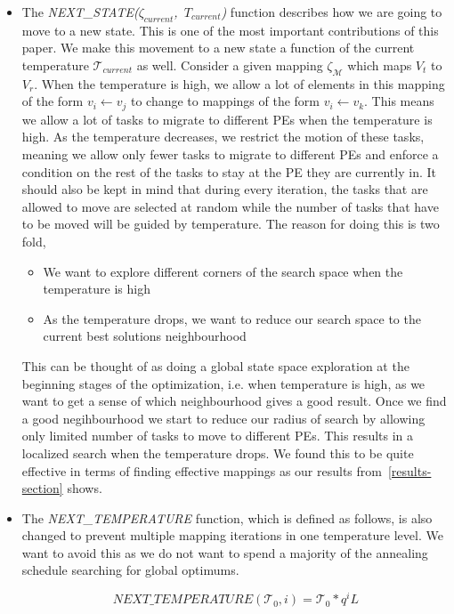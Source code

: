 \begin{itemize}
\item The \mbox{\textit{NEXT\_STATE($\zeta_{current}$, $T_{current}$)}} function
describes how we are going to move to a new state. This is one of the most
important contributions of this paper. We make this movement to a new state a
function of the current temperature $\mathcal{T}_{current}$ as well. Consider a
given mapping $\zeta_\mathcal{M}$ which maps $V_t$ to $V_r$. When the
temperature is high, we allow a lot of elements in this mapping of the form $v_i
\leftarrow v_j$ to change to mappings of the form $v_i \leftarrow v_k$. This
means we allow a lot of tasks to migrate to different PEs when the temperature
is high. As the temperature decreases, we restrict the motion of these tasks,
meaning we allow only fewer tasks to migrate to different PEs and enforce a
condition on the rest of the tasks to stay at the PE they are currently in. It
should also be kept in mind that during every iteration, the tasks that are
allowed to move are selected at random while the number of tasks that have to be
moved will be guided by temperature. The reason for doing this is two fold,
\begin{itemize}
\item We want to explore different corners of the search space when the
temperature is high
\item As the temperature drops, we want to reduce our search space to the
current best solutions neighbourhood
\end{itemize}
This can be thought of as doing a global state space exploration at the beginning
stages of the optimization, i.e. when temperature is high, as we want to get a
sense of which neighbourhood gives a good result. Once we find a good
negihbourhood we start to reduce our radius of search by allowing only limited
number of tasks to move to different PEs. This results in a localized search
when the temperature drops. We found this to be quite effective in terms of
finding effective mappings as our results from~\ref{results-section} shows.

\item The \textit{NEXT\_TEMPERATURE} function, which is defined as follows, is
also changed to prevent multiple mapping iterations in one temperature level. We
want to avoid this as we do not want to spend a majority of the annealing
schedule searching for global optimums. 

\begin{equation}
\textit{NEXT\_TEMPERATURE}(\mathcal{T}_0, i) = \mathcal{T}_0*q^{i}{L}
\end{equation}


\end{itemize}
